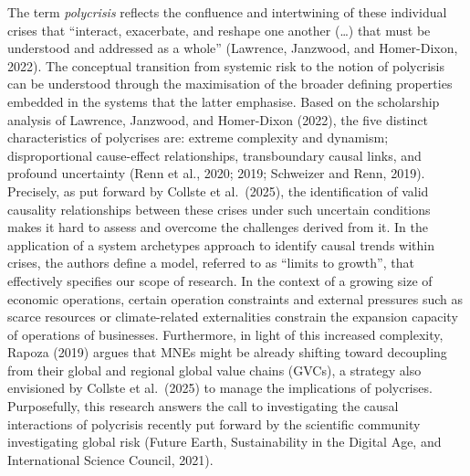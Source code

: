 \documentclass[authoryear,preprint,review,12pt]{elsarticle}
\begin{document}
The term \textit{polycrisis} reflects the confluence and intertwining of these individual crises that ``interact, exacerbate, and reshape one another (\ldots) that must be understood and addressed as a whole'' (Lawrence, Janzwood, and Homer-Dixon, 2022). The conceptual transition from systemic risk to the notion of polycrisis can be understood through the maximisation of the broader defining properties embedded in the systems that the latter emphasise. Based on the scholarship analysis of Lawrence, Janzwood, and Homer-Dixon (2022), the five distinct characteristics of polycrises are: extreme complexity and dynamism; disproportional cause-effect relationships, transboundary causal links, and profound uncertainty (Renn et al., 2020; 2019; Schweizer and Renn, 2019). Precisely, as put forward by Collste et al.\ (2025), the identification of valid causality relationships between these crises under such uncertain conditions makes it hard to assess and overcome the challenges derived from it. In the application of a system archetypes approach to identify causal trends within crises, the authors define a model, referred to as ``limits to growth'', that effectively specifies our scope of research. In the context of a growing size of economic operations, certain operation constraints and external pressures such as scarce resources or climate-related externalities constrain the expansion capacity of operations of businesses. Furthermore, in light of this increased complexity, Rapoza (2019) argues that MNEs might be already shifting toward decoupling from their global and regional global value chains (GVCs), a strategy also envisioned by Collste et al.\ (2025) to manage the implications of polycrises. Purposefully, this research answers the call to investigating the causal interactions of polycrisis recently put forward by the scientific community investigating global risk (Future Earth, Sustainability in the Digital Age, and International Science Council, 2021).
\end{document}
